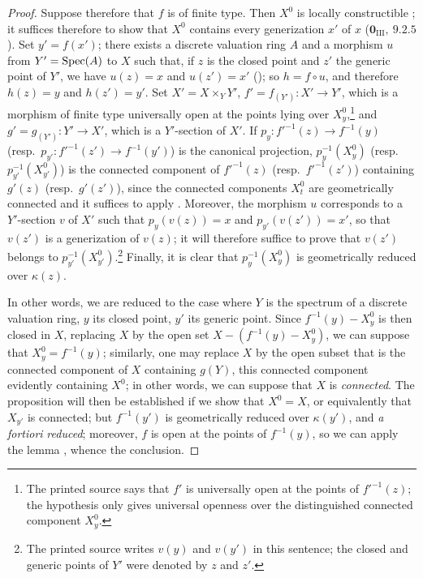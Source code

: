 \begin{proof}
Suppose therefore that $f$ is of finite type.
Then $X^0$ is locally constructible ; it suffices therefore to show that $X^0$ contains every generization $x'$ of $x$ ($\mathbf{0}_{\mathrm{III}},~9.2.5$).
Set $y'=f(x')$; there exists a discrete valuation ring $A$ and a morphism $u$ from $Y'=\operatorname{Spec}(A)$ to $X$ such that, if $z$ is the closed point and $z'$ the generic point of $Y'$, we have $u(z)=x$ and $u(z')=x'$ (); so $h=f\circ u$, and therefore $h(z)=y$ and $h(z')=y'$.
Set $X'=X\times_Y Y'$, $f'=f_{(Y')}:X'\to Y'$, which is a morphism of finite type universally open at the points lying over $X_y^0$,\footnote{The printed source says that $f'$ is universally open at the points of $f'^{-1}(z)$; the hypothesis only gives universal openness over the distinguished connected component $X_y^0$.} and $g'=g_{(Y')}:Y'\to X'$, which is a $Y'$-section of $X'$.
If $p_y:f'^{-1}(z)\to f^{-1}(y)$ (resp.\ $p_{y'}:f'^{-1}(z')\to f^{-1}(y')$) is the canonical projection, $p_y^{-1}(X_y^0)$ (resp.\ $p_{y'}^{-1}(X_{y'}^0)$) is the connected component of $f'^{-1}(z)$ (resp.\ $f'^{-1}(z')$) containing $g'(z)$ (resp.\ $g'(z')$), since the connected components $X_t^0$ are geometrically connected  and it suffices to apply .
Moreover, the morphism $u$ corresponds to a $Y'$-section $v$ of $X'$ such that $p_y(v(z))=x$ and $p_{y'}(v(z'))=x'$, so that $v(z')$ is a generization of $v(z)$; it will therefore suffice to prove that $v(z')$ belongs to $p_{y'}^{-1}(X_{y'}^0)$.\footnote{The printed source writes $v(y)$ and $v(y')$ in this sentence; the closed and generic points of $Y'$ were denoted by $z$ and $z'$.}
Finally, it is clear that $p_y^{-1}(X_y^0)$ is geometrically reduced over $\kappa(z)$.

In other words, we are reduced to the case where $Y$ is the spectrum of a discrete valuation ring, $y$ its closed point, $y'$ its generic point.
Since $f^{-1}(y)-X_y^0$ is then closed in $X$, replacing $X$ by the open set $X-(f^{-1}(y)-X_y^0)$, we can suppose that $X_y^0=f^{-1}(y)$; similarly, one may replace $X$ by the open subset that is the connected component of $X$ containing $g(Y)$, this connected component evidently containing $X^0$; in other words, we can suppose that $X$ is \emph{connected}.
The proposition will then be established if we show that $X^0=X$, or equivalently that $X_{y'}$ is connected; but $f^{-1}(y')$ is geometrically reduced over $\kappa(y')$, and \emph{a fortiori} \emph{reduced}; moreover, $f$ is open at the points of $f^{-1}(y)$, so we can apply the lemma , whence the conclusion.
\end{proof}

